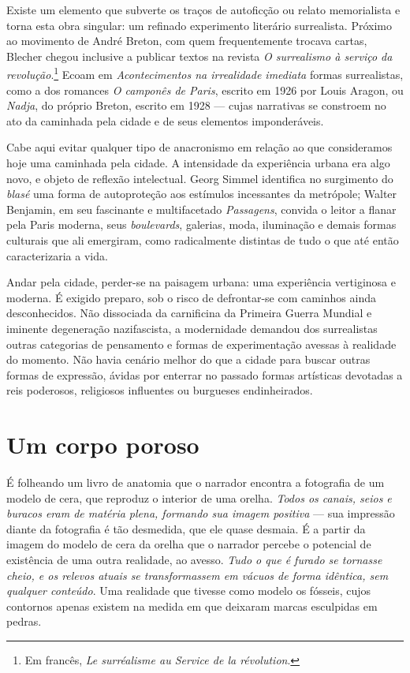 Existe um elemento que subverte os traços de autoficção ou relato memorialista e torna esta obra singular: um refinado experimento literário surrealista. Próximo ao movimento de André Breton, com quem frequentemente trocava cartas, Blecher chegou inclusive a publicar textos na revista \textit{O surrealismo à serviço da revolução}.\footnote{Em francês, \textit{Le surréalisme au Service de la révolution}.} Ecoam em \textit{Acontecimentos na irrealidade imediata} formas surrealistas, como a dos romances \textit{O camponês de Paris}, escrito em 1926 por Louis Aragon, ou \textit{Nadja}, do próprio Breton, escrito em 1928 --- cujas narrativas se constroem no ato da caminhada pela cidade e de seus elementos imponderáveis.

Cabe aqui evitar qualquer tipo de anacronismo em relação ao que consideramos hoje uma caminhada pela cidade. A intensidade da experiência urbana era algo novo, e objeto de reflexão intelectual. Georg Simmel identifica no surgimento do \textit{blasé} uma forma de autoproteção aos estímulos incessantes da metrópole; Walter Benjamin, em seu fascinante e multifacetado \textit{Passagens}, convida o leitor a flanar pela Paris moderna, seus \textit{boulevards}, galerias, moda, iluminação e demais formas culturais que ali emergiram, como radicalmente distintas de tudo o que até então caracterizaria a vida.

Andar pela cidade, perder-se na paisagem urbana: uma experiência vertiginosa e moderna. É exigido preparo, sob o risco de defrontar-se com caminhos ainda desconhecidos. Não dissociada da carnificina da Primeira Guerra Mundial e iminente degeneração nazifascista, a modernidade demandou dos surrealistas outras categorias de pensamento e formas de experimentação avessas à realidade do momento. Não havia cenário melhor do que a cidade para buscar outras formas de expressão, ávidas por enterrar no passado formas artísticas devotadas a reis poderosos, religiosos influentes ou burgueses endinheirados.

\section{Um corpo poroso}

É folheando um livro de anatomia que o narrador encontra a fotografia de um modelo de cera, que reproduz o interior de uma orelha. \textit{Todos os canais, seios e buracos eram de matéria plena, formando sua imagem positiva} --- sua impressão diante da fotografia é tão desmedida, que ele quase desmaia. É a partir da imagem do modelo de cera da orelha que o narrador percebe o potencial de existência de uma outra realidade, ao avesso. \textit{Tudo o que é furado se tornasse cheio, e os relevos atuais se transformassem em vácuos de forma idêntica, sem qualquer conteúdo}. Uma realidade que tivesse como modelo os fósseis, cujos contornos apenas existem na medida em que deixaram marcas esculpidas em pedras.

